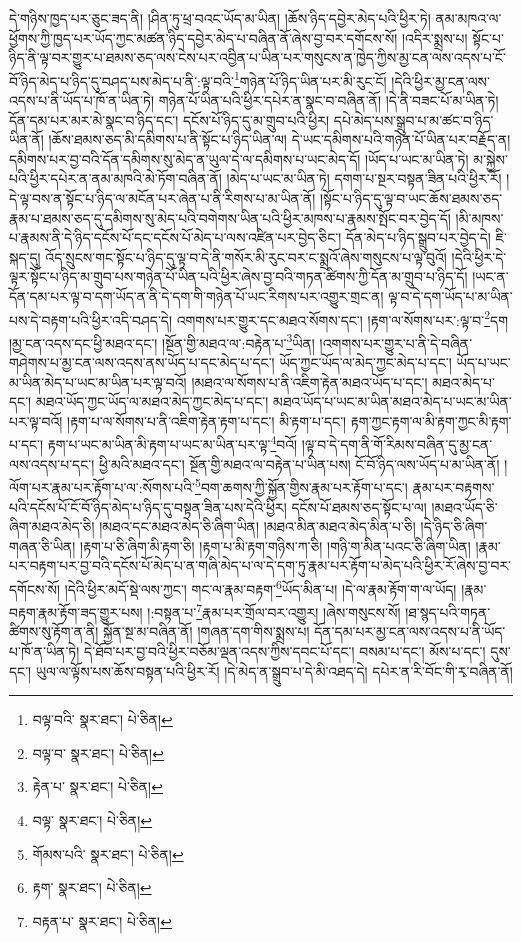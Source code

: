 དེ་གཉིས་ཁྱད་པར་ཅུང་ཟད་ནི། །ཤིན་ཏུ་ཕྲ་བའང་ཡོད་མ་ཡིན། །ཆོས་ཉིད་དབྱེར་མེད་པའི་ཕྱིར་ཏེ། ནམ་མཁའ་ལ་ཕྱོགས་ཀྱི་ཁྱད་པར་ཡོད་ཀྱང་མཚན་ཉིད་དབྱེར་མེད་པ་བཞིན་ནོ་ཞེས་བྱ་བར་དགོངས་སོ། །འདིར་སྨྲས་པ། སྟོང་པ་ཉིད་ནི་ལྟ་བར་གྱུར་པ་ཐམས་ཅད་ལས་ངེས་པར་འབྱིན་པ་ཡིན་པར་གསུངས་ན་ཁྱེད་ཀྱིས་མྱ་ངན་ལས་འདས་པ་ངོ་བོ་ཉིད་མེད་པ་ཉིད་དུ་བཤད་པས་མེད་པ་ནི་:ལྟ་བའི་\footnote{བལྟ་བའི་  སྣར་ཐང་།  པེ་ཅིན། }གཉེན་པོ་ཉིད་ཡིན་པར་མི་རུང་ངོ། །དེའི་ཕྱིར་མྱ་ངན་ལས་འདས་པ་ནི་ཡོད་པ་ཁོ་ན་ཡིན་ཏེ། གཉེན་པོ་ཡིན་པའི་ཕྱིར་དཔེར་ན་སྣང་བ་བཞིན་ནོ། །དེ་ནི་བཟང་པོ་མ་ཡིན་ཏེ། དོན་དམ་པར་མར་མེ་སྣང་བ་ཉིད་དང་། དངོས་པོ་ཉིད་དུ་མ་གྲུབ་པའི་ཕྱིར། དཔེ་མེད་པས་སྒྲུབ་པ་མ་ཚང་བ་ཉིད་ཡིན་ནོ། །ཆོས་ཐམས་ཅད་མི་དམིགས་པ་ནི་སྟོང་པ་ཉིད་ཡིན་ལ། དེ་ཡང་དམིགས་པའི་གཉེན་པོ་ཡིན་པར་བརྗོད་ན། དམིགས་པར་བྱ་བའི་དོན་དམིགས་སུ་མེད་ན་ཡུལ་དེ་ལ་དམིགས་པ་ཡང་མེད་དོ། །ཡོད་པ་ཡང་མ་ཡིན་ཏེ། མ་སྐྱེས་པའི་ཕྱིར་དཔེར་ན་ནམ་མཁའི་མེ་ཏོག་བཞིན་ནོ། །མེད་པ་ཡང་མ་ཡིན་ཏེ། དགག་པ་སྔར་བསྟན་ཟིན་པའི་ཕྱིར་རོ། །དེ་ལྟ་བས་ན་སྟོང་པ་ཉིད་ལ་མངོན་པར་ཞེན་པ་ནི་རིགས་པ་མ་ཡིན་ནོ། །སྟོང་པ་ཉིད་དུ་ལྟ་བ་ཡང་ཆོས་ཐམས་ཅད་རྣམ་པ་ཐམས་ཅད་དུ་དམིགས་སུ་མེད་པའི་བགེགས་ཡིན་པའི་ཕྱིར་མཁས་པ་རྣམས་སྤོང་བར་བྱེད་དོ། །མི་མཁས་པ་རྣམས་ནི་དེ་ཉིད་དངོས་པོ་དང་དངོས་པོ་མེད་པ་ལས་འཛིན་པར་བྱེད་ཅིང་། དོན་མེད་པ་ཉིད་སྒྲུབ་པར་བྱེད་དེ། ཇི་སྐད་དུ། འོད་སྲུངས་གང་སྟོང་པ་ཉིད་དུ་ལྟ་བ་དེ་ནི་གསོར་མི་རུང་བར་ང་སྨྲའོ་ཞེས་གསུངས་པ་ལྟ་བུའོ། །དེའི་ཕྱིར་དེ་ལྟར་སྟོང་པ་ཉིད་མ་གྲུབ་པས་གཉེན་པོ་ཡིན་པའི་ཕྱིར་ཞེས་བྱ་བའི་གཏན་ཚིགས་ཀྱི་དོན་མ་གྲུབ་པ་ཉིད་དོ། །ཡང་ན་དོན་དམ་པར་ལྟ་བ་དག་ཡོད་ན་ནི་དེ་དག་གི་གཉེན་པོ་ཡང་རིགས་པར་འགྱུར་གྲང་ན། ལྟ་བ་དེ་དག་ཡོད་པ་མ་ཡིན་པས་དེ་བརྟག་པའི་ཕྱིར་འདི་བཤད་དེ། འགགས་པར་གྱུར་དང་མཐའ་སོགས་དང་། །རྟག་ལ་སོགས་པར་:ལྟ་བ་\footnote{བལྟ་བ་  སྣར་ཐང་།  པེ་ཅིན། }དག །མྱ་ངན་འདས་དང་ཕྱི་མཐའ་དང་། །སྔོན་གྱི་མཐའ་ལ་:བརྟེན་པ་\footnote{རྟེན་པ་  སྣར་ཐང་།  པེ་ཅིན། }ཡིན། །འགགས་པར་གྱུར་པ་ནི་དེ་བཞིན་གཤེགས་པ་མྱ་ངན་ལས་འདས་ནས་ཡོད་པ་དང་མེད་པ་དང་། ཡོད་ཀྱང་ཡོད་ལ་མེད་ཀྱང་མེད་པ་དང་། ཡོད་པ་ཡང་མ་ཡིན་མེད་པ་ཡང་མ་ཡིན་པར་ལྟ་བའོ། །མཐའ་ལ་སོགས་པ་ནི་འཇིག་རྟེན་མཐའ་ཡོད་པ་དང་། མཐའ་མེད་པ་དང་། མཐའ་ཡོད་ཀྱང་ཡོད་ལ་མཐའ་མེད་ཀྱང་མེད་པ་དང་། མཐའ་ཡོད་པ་ཡང་མ་ཡིན་མཐའ་མེད་པ་ཡང་མ་ཡིན་པར་ལྟ་བའོ། །རྟག་པ་ལ་སོགས་པ་ནི་འཇིག་རྟེན་རྟག་པ་དང་། མི་རྟག་པ་དང་། རྟག་ཀྱང་རྟག་ལ་མི་རྟག་ཀྱང་མི་རྟག་པ་དང་། རྟག་པ་ཡང་མ་ཡིན་མི་རྟག་པ་ཡང་མ་ཡིན་པར་ལྟ་\footnote{བལྟ་  སྣར་ཐང་།  པེ་ཅིན། }བའོ། །ལྟ་བ་དེ་དག་ནི་གོ་རིམས་བཞིན་དུ་མྱ་ངན་ལས་འདས་པ་དང་། ཕྱི་མའི་མཐའ་དང་། སྔོན་གྱི་མཐའ་ལ་བརྟེན་པ་ཡིན་པས། ངོ་བོ་ཉིད་ལས་ཡོད་པ་མ་ཡིན་ནོ། །ལོག་པར་རྣམ་པར་རྟོག་པ་ལ་:སོགས་པའི་\footnote{གོམས་པའི་  སྣར་ཐང་།  པེ་ཅིན། }བག་ཆགས་ཀྱི་སྐྱོན་གྱིས་རྣམ་པར་རྟོག་པ་དང་། རྣམ་པར་བརྟགས་པའི་དངོས་པོ་ངོ་བོ་ཉིད་མེད་པ་ཉིད་དུ་བསྟན་ཟིན་པས་དེའི་ཕྱིར། དངོས་པོ་ཐམས་ཅད་སྟོང་པ་ལ། །མཐའ་ཡོད་ཅི་ཞིག་མཐའ་མེད་ཅི། །མཐའ་དང་མཐའ་མེད་ཅི་ཞིག་ཡིན། །མཐའ་མིན་མཐའ་མེད་མིན་པ་ཅི། །དེ་ཉིད་ཅི་ཞིག་གཞན་ཅི་ཡིན། །རྟག་པ་ཅི་ཞིག་མི་རྟག་ཅི། །རྟག་པ་མི་རྟག་གཉིས་ཀ་ཅི། །གཉི་ག་མིན་པའང་ཅི་ཞིག་ཡིན། །རྣམ་པར་བརྟག་པར་བྱ་བའི་དངོས་པོ་མེད་པ་ན་གཞི་མེད་པ་ལ་དེ་དག་ཏུ་རྣམ་པར་རྟོག་པ་མེད་པའི་ཕྱིར་རོ་ཞེས་བྱ་བར་དགོངས་སོ། །དེའི་ཕྱིར་མདོ་སྡེ་ལས་ཀྱང་། གང་ལ་རྣམ་བརྟག་\footnote{རྟག་  སྣར་ཐང་།  པེ་ཅིན། }ཡོད་མིན་པ། །དེ་ལ་རྣམ་རྟོག་ག་ལ་ཡོད། །རྣམ་བརྟག་རྣམ་རྟོག་ཟད་གྱུར་པས། །:བསྟན་པ་\footnote{བརྟན་པ་  སྣར་ཐང་།  པེ་ཅིན། }རྣམ་པར་གྲོལ་བར་འགྱུར། །ཞེས་གསུངས་སོ། །ཐ་སྙད་པའི་གཏན་ཚིགས་སུ་རྟོག་ན་ནི། སྐྱོན་སྔ་མ་བཞིན་ནོ། །གཞན་དག་གིས་སྨྲས་པ། དོན་དམ་པར་མྱ་ངན་ལས་འདས་པ་ནི་ཡོད་པ་ཁོ་ན་ཡིན་ཏེ། དེ་ཐོབ་པར་བྱ་བའི་ཕྱིར་བཅོམ་ལྡན་འདས་ཀྱིས་དབང་པོ་དང་། བསམ་པ་དང་། མོས་པ་དང་། དུས་དང་། ཡུལ་ལ་ལྟོས་པས་ཆོས་བསྟན་པའི་ཕྱིར་རོ། །དེ་མེད་ན་སྒྲུབ་པ་དེ་མི་འཐད་དེ། དཔེར་ན་རི་བོང་གི་རྭ་བཞིན་ནོ། 